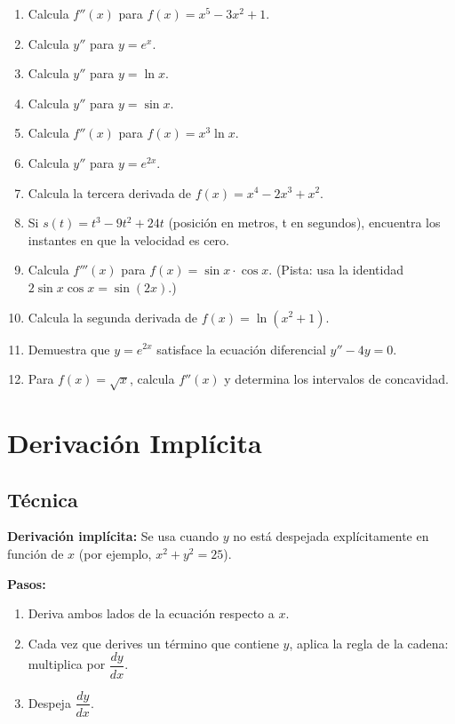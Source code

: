 \documentclass[12pt, a4paper]{article}
\begin{document}
\begin{enumerate}[leftmargin=*, resume]
  \item \facil{} Calcula $f''(x)$ para $f(x) = x^5 - 3x^2 + 1$.
  \item \facil{} Calcula $y''$ para $y = e^x$.
  \item \facil{} Calcula $y''$ para $y = \ln x$.
  \item \facil{} Calcula $y''$ para $y = \sin x$.
  \item \medio{} Calcula $f''(x)$ para $f(x) = x^3 \ln x$.
  \item \medio{} Calcula $y''$ para $y = e^{2x}$.
  \item \medio{} Calcula la tercera derivada de $f(x) = x^4 - 2x^3 + x^2$.
  \item \medio{} Si $s(t) = t^3 - 9t^2 + 24t$ (posición en metros, t en segundos), encuentra los instantes en que la velocidad es cero.
  \item \dificil{} Calcula $f'''(x)$ para $f(x) = \sin x \cdot \cos x$. (Pista: usa la identidad $2\sin x\cos x = \sin(2x)$.)
  \item \dificil{} Calcula la segunda derivada de $f(x) = \ln(x^2 + 1)$.
  \item \dificil{} Demuestra que $y = e^{2x}$ satisface la ecuación diferencial $y'' - 4y = 0$.
  \item \dificil{} Para $f(x) = \sqrt{x}$, calcula $f''(x)$ y determina los intervalos de concavidad.
\end{enumerate}

\newpage

\section{Derivación Implícita}

\subsection{Técnica}

\begin{cuadroteoria}
  \textbf{Derivación implícita:} Se usa cuando $y$ no está despejada explícitamente en función de $x$ (por ejemplo, $x^2 + y^2 = 25$).

  \textbf{Pasos:}
  \begin{enumerate}[leftmargin=*]
    \item Deriva ambos lados de la ecuación respecto a $x$.
    \item Cada vez que derives un término que contiene $y$, aplica la regla de la cadena: multiplica por $\dfrac{dy}{dx}$.
    \item Despeja $\dfrac{dy}{dx}$.
  \end{enumerate}
\end{cuadroteoria}
\end{document}
